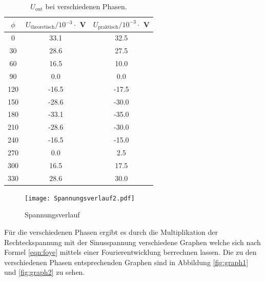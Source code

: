 \begin{table}
    \centering
    \begin{tabular}{c c c}
    	\toprule
    	$\phi$ & $U_{\text{theoretisch}} / 10^{-3} \cdot $ V & $U_{\text{praktisch}} / 10^{-3} \cdot $ V \\
    	\midrule
    	0   &  33.1  &  32.5        \\
    	30  &  28.6  &  27.5        \\
   	60  &  16.5  &  10.0       \\
    	90  &  0.0   &   0.0        \\
    	120 & -16.5  & -17.5        \\ 
    	150 & -28.6  & -30.0        \\
    	180 & -33.1  & -35.0        \\
    	210 & -28.6  & -30.0        \\
    	240 & -16.5  & -15.0        \\
    	270 &  0.0   &  2.5         \\
    	300 &  16.5  &  17.5        \\
  	330 &  28.6  &  30.0        \\
    	\end{tabular}
    \caption{$U_{\text{out}}$ bei verschiedenen Phasen.}
    \label{tab:Uphase2}
\end{table}

\begin{figure}
  \centering
  \texttt{[image: Spannungsverlauf2.pdf]}
  \caption{Spannungsverlauf}
  \label{fig:Spannungsverlauf}
\end{figure}

Für die verschiedenen Phasen ergibt es durch die Multiplikation der Rechteckspannung mit der Sinusspannung verschiedene Graphen welche sich nach Formel \ref{eqn:foye} mittels einer Fourierentwicklung berrechnen lassen. Die zu den verschiedenen Phasen entsprechenden Graphen sind in Abbildung \ref{fig:graph1} und \ref{fig:graph2} zu sehen.

